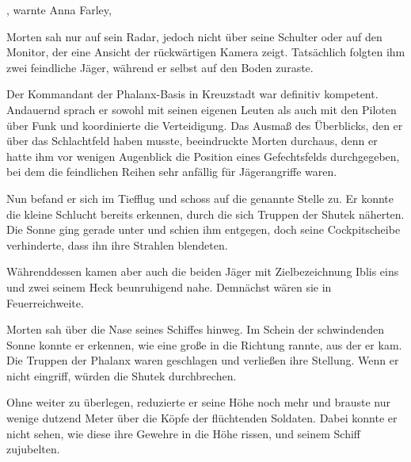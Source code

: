 , warnte Anna Farley, 

\par

Morten sah nur auf sein Radar, jedoch nicht über seine Schulter oder auf den Monitor, der eine Ansicht der rückwärtigen Kamera zeigt. Tatsächlich folgten ihm zwei feindliche Jäger, während er selbst auf den Boden zuraste.

\par

Der Kommandant der Phalanx-Basis in Kreuzstadt war definitiv kompetent. Andauernd sprach er sowohl mit seinen eigenen Leuten als auch mit den Piloten über Funk und koordinierte die Verteidigung. Das Ausmaß des Überblicks, den er über das Schlachtfeld haben musste, beeindruckte Morten durchaus, denn er hatte ihm vor wenigen Augenblick die Position eines Gefechtsfelds durchgegeben, bei dem die feindlichen Reihen sehr anfällig für Jägerangriffe waren.

\par

Nun befand er sich im Tiefflug und schoss auf die genannte Stelle zu. Er konnte die kleine Schlucht bereits erkennen, durch die sich Truppen der Shutek näherten. Die Sonne ging gerade unter und schien ihm entgegen, doch seine Cockpitscheibe verhinderte, dass ihn ihre Strahlen blendeten.

\par

Währenddessen kamen aber auch die beiden Jäger mit Zielbezeichnung Iblis eins und zwei seinem Heck beunruhigend nahe. Demnächst wären sie in Feuerreichweite.

\par

Morten sah über die Nase seines Schiffes hinweg. Im Schein der schwindenden Sonne konnte er erkennen, wie eine große in die Richtung rannte, aus der er kam. Die Truppen der Phalanx waren geschlagen und verließen ihre Stellung. Wenn er nicht eingriff, würden die Shutek durchbrechen.

\par

Ohne weiter zu überlegen, reduzierte er seine Höhe noch mehr und brauste nur wenige dutzend Meter über die Köpfe der flüchtenden Soldaten. Dabei konnte er nicht sehen, wie diese ihre Gewehre in die Höhe rissen, und seinem Schiff zujubelten.

\par

